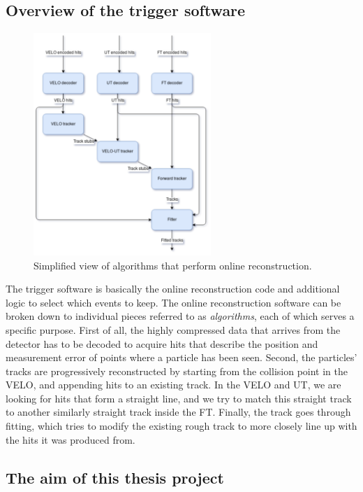 \documentclass[12pt]{article}
\begin{document}
	
	\subsection{Overview of the trigger software}
		
	\begin{figure}[H]
		\begin{center}
			\includegraphics[width=0.6\textwidth]{algorithms_brunel}
		\end{center}
		\caption{Simplified view of algorithms that perform online reconstruction.}
		\label{fig_algorithms_brunel}
	\end{figure}


	The trigger software is basically the online reconstruction code and additional logic to select which events to keep. The online reconstruction software can be broken down to individual pieces referred to as \textit{algorithms}, each of which serves a specific purpose. First of all, the highly compressed data that arrives from the detector has to be decoded to acquire hits that describe the position and measurement error of points where a particle has been seen. Second, the particles' tracks are progressively reconstructed by starting from the collision point in the VELO, and appending hits to an existing track. In the VELO and UT, we are looking for hits that form a straight line, and we try to match this straight track to another similarly straight track inside the FT. Finally, the track goes through fitting, which tries to modify the existing rough track to more closely line up with the hits it was produced from.
	

	\subsection{The aim of this thesis project}
	
\end{document}

